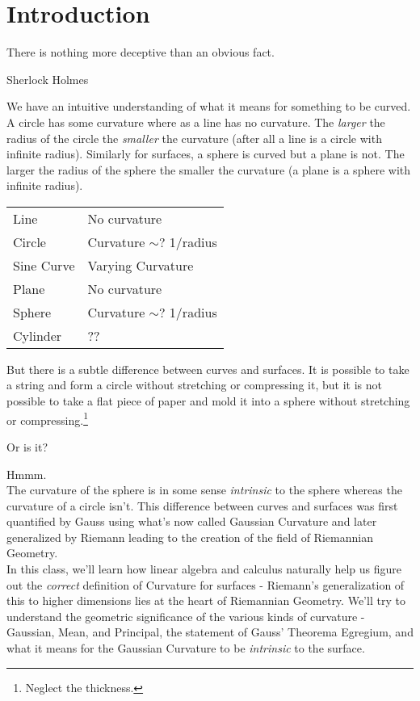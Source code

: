 
\setcounter{section}{-1}
\section{Introduction}
\epigraph{There is nothing more deceptive than an obvious fact.}{Sherlock Holmes}

We have an intuitive understanding of what it means for something to be curved. A circle has some curvature where as a line has no curvature. The \emph{larger} the radius of the circle the \emph{smaller} the curvature (after all a line is a circle with infinite radius). Similarly for surfaces, a sphere is curved but a plane is not. The larger the radius of the sphere the smaller the curvature (a plane is a sphere with infinite radius).

\begin{center}
\begin{tabular}{|l|l|}
  \hline Line & No curvature \\
   Circle & Curvature $\sim?$ 1/radius \\
   Sine Curve & Varying Curvature \\
   Plane & No curvature \\
   Sphere & Curvature $\sim?$ 1/radius \\
   Cylinder & ??\\
  \hline
\end{tabular}
\end{center}
But there is a subtle difference between curves and surfaces. It is possible to take a string and form a circle without stretching or compressing it, but it is not possible to take a flat piece of paper and mold it into a sphere without stretching or compressing.\footnote{Neglect the thickness.}

Or is it?

Hmmm.\\

The curvature of the sphere is in some sense \emph{intrinsic} to the sphere whereas the curvature of a circle isn't. This difference between curves and surfaces was first quantified by Gauss using what's now called Gaussian Curvature and later generalized by Riemann leading to the creation of the field of Riemannian Geometry.\\

In this class, we'll learn how linear algebra and calculus naturally help us figure out the \emph{correct} definition of Curvature for surfaces - Riemann's generalization of this to higher dimensions lies at the heart of Riemannian Geometry. We'll try to understand the geometric significance of the various kinds of curvature - Gaussian, Mean, and Principal, the statement of Gauss' Theorema Egregium, and what it means for the Gaussian Curvature to be \emph{intrinsic} to the surface.
